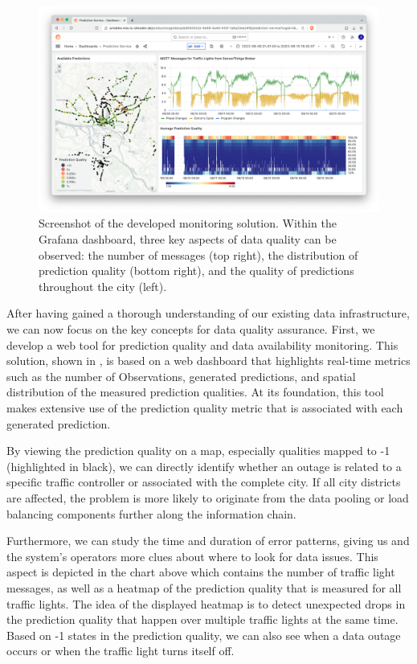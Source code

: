 \begin{figure}[!b]
\centering
\includegraphics[width=\linewidth]{images/monitoring-screenshot.png}
\caption{Screenshot of the developed monitoring solution. Within the Grafana dashboard, three key aspects of data quality can be observed: the number of messages (top right), the distribution of prediction quality (bottom right), and the quality of predictions throughout the city (left).}
\label{fig:monitoring-screenshot}
\end{figure}

After having gained a thorough understanding of our existing data infrastructure, we can now focus on the key concepts for data quality assurance. First, we develop a web tool for prediction quality and data availability monitoring. This solution, shown in , is based on a web dashboard that highlights real-time metrics such as the number of Observations, generated predictions, and spatial distribution of the measured prediction qualities. At its foundation, this tool makes extensive use of the prediction quality metric that is associated with each generated prediction.

By viewing the prediction quality on a map, especially qualities mapped to -1 (highlighted in black), we can directly identify whether an outage is related to a specific traffic controller or associated with the complete city. If all city districts are affected, the problem is more likely to originate from the data pooling or load balancing components further along the information chain. 

Furthermore, we can study the time and duration of error patterns, giving us and the system's operators more clues about where to look for data issues. This aspect is depicted in the chart above which contains the number of traffic light messages, as well as a heatmap of the prediction quality that is measured for all traffic lights. The idea of the displayed heatmap is to detect unexpected drops in the prediction quality that happen over multiple traffic lights at the same time. Based on -1 states in the prediction quality, we can also see when a data outage occurs or when the traffic light turns itself off.

